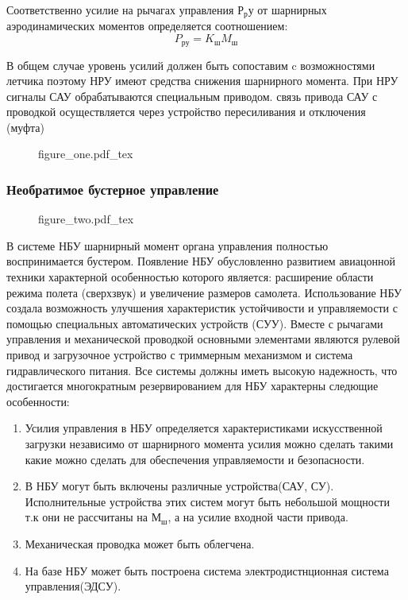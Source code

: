 \documentclass{article}
\begin{document}
Соответственно усилие на рычагах управления $Р_ру$ от шарнирных аэродинамических моментов определяется соотношением:
\[
P_{ру} = K_{ш} M_{ш}
\]

В общем случае уровень усилий должен быть сопоставим c возможностями летчика поэтому НРУ имеют средства снижения шарнирного момента. При НРУ сигналы САУ обрабатываются специальным приводом. связь привода САУ с проводкой осуществляется через устройство пересиливания и отключения (муфта)


\begin{figure}[ht]
{figure_one.pdf_tex}
\end{figure}    

\subsubsection{Необратимое бустерное управление}

\begin{figure}[ht]
{figure_two.pdf_tex}
\end{figure}

В системе НБУ шарнирный момент органа управления полностью воспринимается бустером. Появление НБУ обусловленно развитием авиацонной техники характерной особенностью которого является: расширение области режима полета (сверхзвук) и увеличение размеров самолета. Использование НБУ создала возможность улучшения характеристик устойчивости и управляемости с помощью специальных автоматических устройств (СУУ). Вместе с рычагами управления и механической проводкой основными элементами являются рулевой привод и загрузочное устройство с триммерным механизмом и система гидравлического питания. Все системы должны иметь высокую надежность, что достигается многократным резервированием для НБУ характерны следющие особенности:
\begin{enumerate}
\item Усилия управления в НБУ определяется характеристиками искусственной загрузки независимо от шарнирного момента усилия можно сделать такими какие можно сделать для обеспечения управляемости и безопасности.
\item В НБУ могут быть включены различные устройства(САУ, СУ). Исполнительные устройства этих систем могут быть небольшой мощности т.к они не рассчитаны на $М_ш$, а на усилие входной части привода.
\item Механическая проводка может быть облегчена.
\item На базе НБУ может быть построена система электродистнционная система управления(ЭДСУ).
\end{enumerate}
\end{document}
